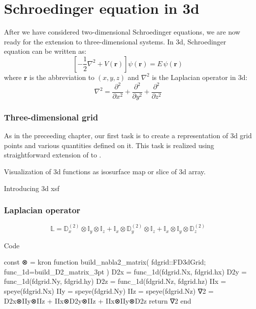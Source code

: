 \chapter{Schroedinger equation in 3d}

After we have considered two-dimensional Schroedinger equations, we are now ready for
the extension to three-dimensional systems. In 3d, Schroedinger equation can be
written as:
\begin{equation}
\left[ -\frac{1}{2}\nabla^2 + V(\mathbf{r}) \right] \psi(\mathbf{r}) = E\,\psi(\mathbf{r})
\end{equation}
where $\mathbf{r}$ is the abbreviation to $(x,y,z)$ and
%
$\nabla^2$ is the Laplacian operator in 3d:
\begin{equation}
\nabla^2 = \frac{\partial^2}{\partial x^2} + \frac{\partial^2}{\partial y^2} +
\frac{\partial^2}{\partial z^2}
\end{equation}

\subsection{Three-dimensional grid}

As in the preceeding chapter, our first task is to create a representation of 3d grid
points and various quantities defined on it. This task is realized using straightforward
extension of  to .


Visualization of 3d functions as isosurface map or slice of 3d array.

Introducing 3d xsf


\subsection{Laplacian operator}

\begin{equation}
\mathbb{L} = \mathbb{D}^{(2)}_{x} \otimes \mathbb{I}_{y} \otimes \mathbb{I}_{z} +
\mathbb{I}_{x} \otimes \mathbb{D}^{(2)}_{y} \otimes \mathbb{I}_{z} +
\mathbb{I}_{x} \otimes \mathbb{I}_{y} \otimes \mathbb{D}^{(2)}_{z}
\end{equation}


Code
\begin{juliacode}
const ⊗ = kron
function build_nabla2_matrix( fdgrid::FD3dGrid; func_1d=build_D2_matrix_3pt )
    D2x = func_1d(fdgrid.Nx, fdgrid.hx)
    D2y = func_1d(fdgrid.Ny, fdgrid.hy)
    D2z = func_1d(fdgrid.Nz, fdgrid.hz)
    IIx = speye(fdgrid.Nx)
    IIy = speye(fdgrid.Ny)
    IIz = speye(fdgrid.Nz)
    ∇2 = D2x⊗IIy⊗IIz + IIx⊗D2y⊗IIz + IIx⊗IIy⊗D2z 
    return ∇2
end
\end{juliacode}


